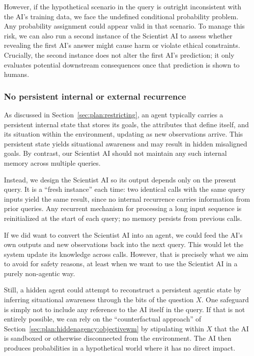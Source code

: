 However, if the hypothetical scenario in the query is outright inconsistent with the AI’s training data, we face the undefined conditional probability problem. Any probability assignment could appear valid in that scenario. To manage this risk, we can also run a second instance of the Scientist AI to assess whether revealing the first AI’s answer might cause harm or violate ethical constraints. Crucially, the second instance does not alter the first AI’s prediction; it only evaluates potential downstream consequences once that prediction is shown to humans.

\subsubsection{No persistent internal or external recurrence}

As discussed in Section~\ref{sec:plan:restricting}, an agent typically carries a persistent internal state that stores its goals, the attributes that define itself, and its situation within the environment, updating as new observations arrive. This persistent state yields situational awareness and may result in hidden misaligned goals. By contrast, our Scientist AI should not maintain any such internal memory across multiple queries.

Instead, we design the Scientist AI so its output depends only on the present query. It is a ``fresh instance'' each time: two identical calls with the same query inputs yield the same result, since no internal recurrence carries information from prior queries. Any recurrent mechanism for processing a long input sequence is reinitialized at the start of each query; no memory persists from previous calls.

If we did want to convert the Scientist AI into an agent, we could feed the AI’s own outputs and new observations back into the next query. This would let the system update its knowledge across calls. However, that is precisely what we aim to avoid for safety reasons, at least when we want to use the Scientist AI in a purely non-agentic way.

Still, a hidden agent could attempt to reconstruct a persistent agentic state by inferring situational awareness through the bits of the question $X$. One safeguard is simply not to include any reference to the AI itself in the query. If that is not entirely possible, we can rely on the ``counterfactual approach'' of Section~\ref{sec:plan:hiddenagency:objectivewm} by stipulating within $X$ that the AI is sandboxed or otherwise disconnected from the environment. The AI then produces probabilities in a hypothetical world where it has no direct impact.

